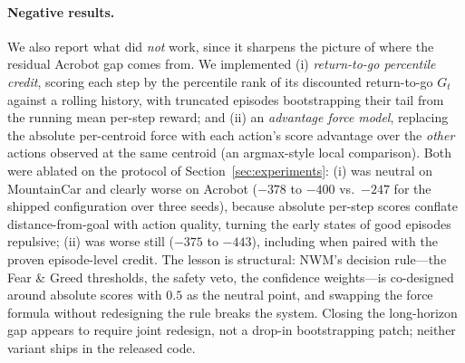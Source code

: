\documentclass[11pt]{article}
\newcommand{\NWM}{\textsc{NWM}}
\begin{document}
\paragraph{Negative results.} We also report what did \emph{not} work, since it
sharpens the picture of where the residual Acrobot gap comes from. We
implemented (i) \emph{return-to-go percentile credit}, scoring each step by the
percentile rank of its discounted return-to-go $G_t$ against a rolling history,
with truncated episodes bootstrapping their tail from the running mean per-step
reward; and (ii) an \emph{advantage force model}, replacing the absolute
per-centroid force with each action's score advantage over the \emph{other}
actions observed at the same centroid (an argmax-style local comparison). Both
were ablated on the protocol of Section~\ref{sec:experiments}: (i) was neutral
on MountainCar and clearly worse on Acrobot ($-378$ to $-400$ vs.\ $-247$ for
the shipped configuration over three seeds), because absolute per-step scores
conflate distance-from-goal with action quality, turning the early states of
good episodes repulsive; (ii) was worse still ($-375$ to $-443$), including
when paired with the proven episode-level credit. The lesson is structural:
\NWM{}'s decision rule---the Fear \& Greed thresholds, the safety veto, the
confidence weights---is co-designed around absolute scores with $0.5$ as the
neutral point, and swapping the force formula without redesigning the rule
breaks the system. Closing the long-horizon gap appears to require joint
redesign, not a drop-in bootstrapping patch; neither variant ships in the
released code.
\end{document}

